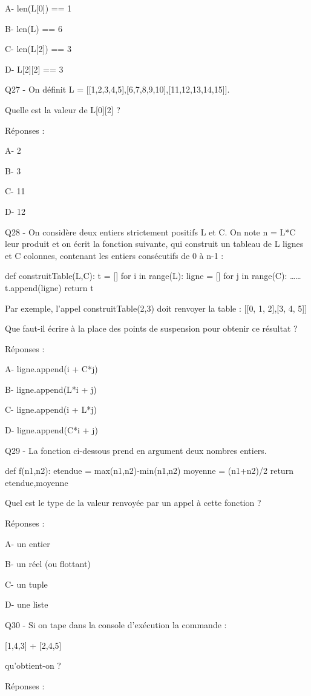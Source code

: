 \documentclass[
]{book}
\begin{document}
A- len(L{[}0{]}) == 1

B- len(L) == 6

C- len(L{[}2{]}) == 3

D- L{[}2{]}{[}2{]} == 3

Q27 - On définit L = {[}{[}1,2,3,4,5{]},{[}6,7,8,9,10{]},{[}11,12,13,14,15{]}{]}.

Quelle est la valeur de L{[}0{]}{[}2{]} ?

Réponses :

A- 2

B- 3

C- 11

D- 12

Q28 - On considère deux entiers strictement positifs L et C. On note n = L*C leur produit et on écrit la fonction suivante, qui construit un tableau de L lignes et C colonnes, contenant les entiers consécutifs de 0 à n-1 :

def construitTable(L,C):
t = {[}{]}
for i in range(L):
ligne = {[}{]}
for j in range(C):
\ldots\ldots{}
t.append(ligne)
return t

Par exemple, l'appel construitTable(2,3) doit renvoyer la table : {[}{[}0, 1, 2{]},{[}3, 4, 5{]}{]}

Que faut-il écrire à la place des points de suspension pour obtenir ce résultat ?

Réponses :

A- ligne.append(i + C*j)

B- ligne.append(L*i + j)

C- ligne.append(i + L*j)

D- ligne.append(C*i + j)

Q29 - La fonction ci-dessous prend en argument deux nombres entiers.

def f(n1,n2):
etendue = max(n1,n2)-min(n1,n2)
moyenne = (n1+n2)/2
return etendue,moyenne

Quel est le type de la valeur renvoyée par un appel à cette fonction ?

Réponses :

A- un entier

B- un réel (ou flottant)

C- un tuple

D- une liste

Q30 - Si on tape dans la console d'exécution la commande :

{[}1,4,3{]} + {[}2,4,5{]}

qu'obtient-on ?

Réponses :
\end{document}
